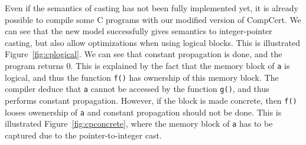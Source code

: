 Even if the semantics of casting has not been fully implemented yet, it is already possible to compile some C programs with our modified version of CompCert. We can see that the new model successfully gives semantics to integer-pointer casting, but also allow optimizations when using logical blocks.
This is illustrated Figure~\ref{fig:cplogical}. We can see that constant propagation is done, and the program returns 0. This is explained by the fact that the memory block of \texttt{a} is logical, and thus the function \texttt{f()} has ownership of this memory block. The compiler deduce that \texttt{a} cannot be accessed by the function \texttt{g()}, and thus performs constant propagation.
However, if the block is made concrete, then \texttt{f()} looses owenership of \texttt{a} and constant propagation should not be done. This is illustrated Figure~\ref{fig:cpconcrete}, where the memory block of \texttt{a} has to be captured due to the pointer-to-integer cast.
